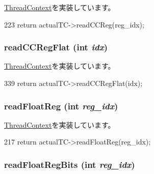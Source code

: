 \hyperlink{classThreadContext_af924a3ae757b2a311dd16bc8acde1c27}{ThreadContext}を実装しています。


\begin{DoxyCode}
223     { return actualTC->readCCReg(reg_idx); }
\end{DoxyCode}
\hypertarget{classCheckerThreadContext_a78f8bb511732f8abab3bd11a18d32072}{
\subsubsection[{readCCRegFlat}]{ readCCRegFlat (int {\em idx})}}
\label{classCheckerThreadContext_a78f8bb511732f8abab3bd11a18d32072}


\hyperlink{classThreadContext_aa6d1af2db95563430c5ce31b38838a93}{ThreadContext}を実装しています。


\begin{DoxyCode}
339     { return actualTC->readCCRegFlat(idx); }
\end{DoxyCode}
\hypertarget{classCheckerThreadContext_a2f97d83baef4fbda00b7f7f62779752f}{
\subsubsection[{readFloatReg}]{ readFloatReg (int {\em reg\_\-idx})}}
\label{classCheckerThreadContext_a2f97d83baef4fbda00b7f7f62779752f}


\hyperlink{classThreadContext_a7883083f396dee2160e4b8640d02f5f6}{ThreadContext}を実装しています。


\begin{DoxyCode}
217     { return actualTC->readFloatReg(reg_idx); }
\end{DoxyCode}
\hypertarget{classCheckerThreadContext_a4998e6615f835676762af364eff198e3}{
\subsubsection[{readFloatRegBits}]{ readFloatRegBits (int {\em reg\_\-idx})}}
\label{classCheckerThreadContext_a4998e6615f835676762af364eff198e3}


